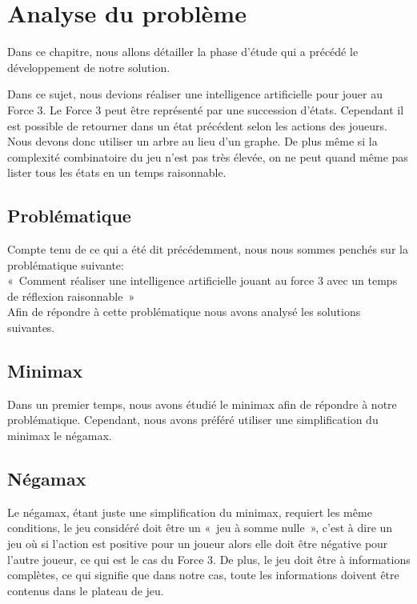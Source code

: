 \chapter{Analyse du problème}

Dans ce chapitre, nous allons détailler la phase d'étude qui a précédé le
développement de notre solution.

Dans ce sujet, nous devions réaliser une intelligence artificielle pour
jouer au Force 3.
Le Force 3 peut être représenté par une succession d'états. Cependant il est
possible de retourner dans un état précédent selon les actions des joueurs.
Nous devons donc utiliser un arbre au lieu d'un graphe.
De plus même si la complexité combinatoire du jeu n'est pas très élevée, on ne peut quand même pas lister tous les états
en un temps raisonnable.

\section{Problématique}

Compte tenu de ce qui a été dit précédemment, nous nous sommes penchés sur la problématique suivante: \\
« Comment réaliser une intelligence artificielle jouant au force 3 avec un temps de réflexion raisonnable » \\
Afin de répondre à cette problématique nous avons analysé les solutions suivantes.

\section{Minimax}

Dans un premier temps, nous avons étudié le minimax afin de répondre à notre
problématique.
Cependant, nous avons préféré utiliser une simplification du minimax le négamax.

\section{Négamax}

Le négamax, étant juste une simplification du minimax, requiert les même conditions,
le jeu considéré doit être un « jeu à somme nulle », c'est à dire un jeu où si
l'action est positive pour un joueur alors elle doit être négative pour l'autre
joueur, ce qui est le cas du Force 3. De plus, le jeu doit être à informations
complètes, ce qui signifie que dans notre cas, toute les informations doivent
être contenus dans le plateau de jeu.

